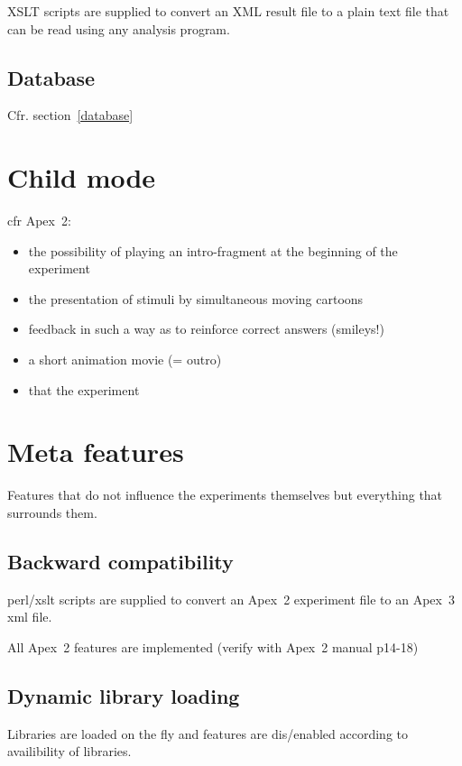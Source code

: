 \documentclass[a4paper,12pt]{article}
\begin{document}
XSLT scripts are supplied to convert an XML result file to a plain text file that can be read using any analysis program.

\subsection{Database}

Cfr. section~\ref{database}



\section{Child mode}

cfr Apex~2:

\begin{itemize}
\item the possibility of playing an intro-fragment at the beginning of the experiment
\item the presentation of stimuli by simultaneous moving cartoons
\item feedback in such a way as to reinforce correct answers (smileys!)
\item a short animation movie (= outro)
\item that the experiment
\end{itemize}

\section{Meta features}

Features that do not influence the experiments themselves but everything that surrounds them.

\subsection{Backward compatibility}

perl/xslt scripts are supplied to convert an Apex~2 experiment file to an Apex~3 xml file. 

All Apex~2 features are implemented (verify with Apex~2 manual p14-18)

\subsection{Dynamic library loading}

Libraries are loaded on the fly and features are dis/enabled according to availibility of libraries.
\end{document}

